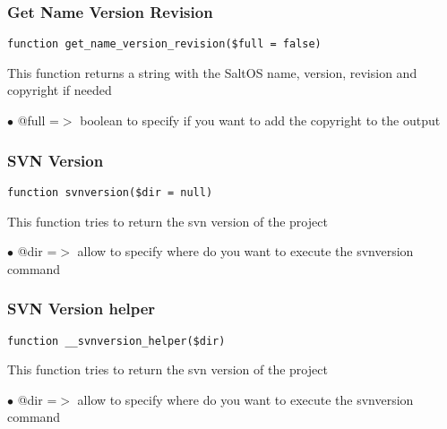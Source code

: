 \documentclass[a4paper]{article}
\begin{document}
\subsubsection{Get Name Version Revision}

\begin{lstlisting}
function get_name_version_revision($full = false)
\end{lstlisting}

This function returns a string with the SaltOS name, version, revision and
copyright if needed

\begin{compactitem}
\item[\color{myblue}$\bullet$] @full =$>$ boolean to specify if you want to add the copyright to the output
\end{compactitem}

\hypertarget{toc270}{}
\subsubsection{SVN Version}

\begin{lstlisting}
function svnversion($dir = null)
\end{lstlisting}

This function tries to return the svn version of the project

\begin{compactitem}
\item[\color{myblue}$\bullet$] @dir =$>$ allow to specify where do you want to execute the svnversion command
\end{compactitem}

\hypertarget{toc271}{}
\subsubsection{SVN Version helper}

\begin{lstlisting}
function __svnversion_helper($dir)
\end{lstlisting}

This function tries to return the svn version of the project

\begin{compactitem}
\item[\color{myblue}$\bullet$] @dir =$>$ allow to specify where do you want to execute the svnversion command
\end{compactitem}
\end{document}
